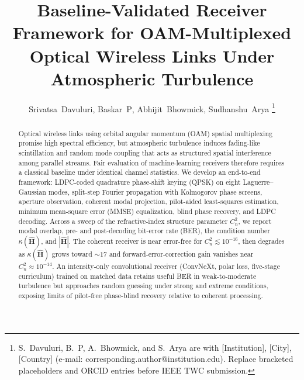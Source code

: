 \documentclass[journal]{IEEEtran}
\begin{document}
\title{Baseline-Validated Receiver Framework for OAM-Multiplexed Optical Wireless Links Under Atmospheric Turbulence}

\author{Srivatsa~Davuluri\textsuperscript{},
        Baskar~P\textsuperscript{},
        Abhijit~Bhowmick\textsuperscript{},
        Sudhanshu~Arya\textsuperscript{}%
\thanks{S.~Davuluri, B.~P, A.~Bhowmick, and S.~Arya are with [Institution], [City], [Country] (e-mail: corresponding.author@institution.edu). Replace bracketed placeholders and ORCID entries before IEEE TWC submission.}%
}

\maketitle
{}


\begin{abstract}
Optical wireless links using orbital angular momentum (OAM) spatial multiplexing promise high spectral efficiency, but atmospheric turbulence induces fading-like scintillation and random mode coupling that acts as structured spatial interference among parallel streams. Fair evaluation of machine-learning receivers therefore requires a classical baseline under identical channel statistics. We develop an end-to-end framework: LDPC-coded quadrature phase-shift keying (QPSK) on eight Laguerre--Gaussian modes, split-step Fourier propagation with Kolmogorov phase screens, aperture observation, coherent modal projection, pilot-aided least-squares estimation, minimum mean-square error (MMSE) equalization, blind phase recovery, and LDPC decoding. Across a sweep of the refractive-index structure parameter $C_n^2$, we report modal overlap, pre- and post-decoding bit-error rate (BER), the condition number $\kappa(\hat{\mathbf{H}})$, and $|\hat{\mathbf{H}}|$. The coherent receiver is near error-free for $C_n^2 \lesssim 10^{-16}$, then degrades as $\kappa(\hat{\mathbf{H}})$ grows toward $\sim 17$ and forward-error-correction gain vanishes near $C_n^2 \approx 10^{-14}$. An intensity-only convolutional receiver (ConvNeXt, polar loss, five-stage curriculum) trained on matched data retains useful BER in weak-to-moderate turbulence but approaches random guessing under strong and extreme conditions, exposing limits of pilot-free phase-blind recovery relative to coherent processing.
\end{abstract}
\end{document}
